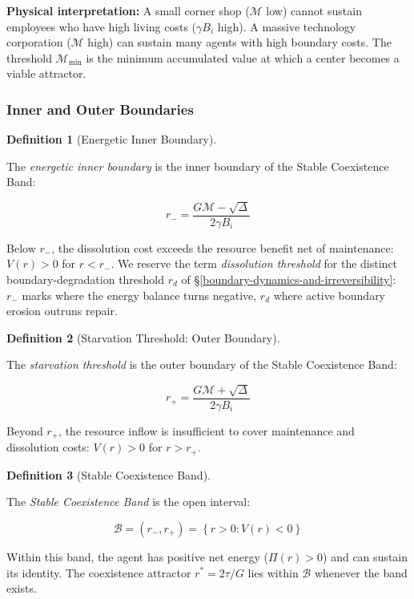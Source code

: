 \documentclass[11pt]{article}
\theoremstyle{plain}
\theoremstyle{definition}
\newtheorem{definition}{Definition}
\theoremstyle{remark}
\let\origsubsubsection\subsubsection
\renewcommand{\subsubsection}{\needspace{4\baselineskip}\origsubsubsection}
\begin{document}
\textbf{Physical interpretation:} A small corner shop (\(\mathcal{M}\)
low) cannot sustain employees who have high living costs (\(\gamma B_i\)
high). A massive technology corporation (\(\mathcal{M}\) high) can
sustain many agents with high boundary costs. The threshold
\(\mathcal{M}_{\min}\) is the minimum accumulated value at which a
center becomes a viable attractor.

\subsubsection{Inner and Outer
Boundaries}\label{inner-and-outer-boundaries}

\begin{definition}[Energetic Inner Boundary]
\label{def-dissolution-threshold}

The \emph{energetic inner boundary} is the inner boundary of the Stable Coexistence Band:

$$r_- = \frac{G\mathcal{M} - \sqrt{\Delta}}{2\gamma B_i}$$

Below $r_-$, the dissolution cost exceeds the resource benefit net of maintenance: $V(r) > 0$ for $r < r_-$. We reserve the term \emph{dissolution threshold} for the distinct boundary-degradation threshold $r_d$ of §\ref{boundary-dynamics-and-irreversibility}: $r_-$ marks where the energy balance turns negative, $r_d$ where active boundary erosion outruns repair.
\end{definition}

\begin{definition}[Starvation Threshold: Outer Boundary]
\label{def-starvation-threshold}

The \emph{starvation threshold} is the outer boundary of the Stable Coexistence Band:

$$r_+ = \frac{G\mathcal{M} + \sqrt{\Delta}}{2\gamma B_i}$$

Beyond $r_+$, the resource inflow is insufficient to cover maintenance and dissolution costs: $V(r) > 0$ for $r > r_+$.
\end{definition}

\begin{definition}[Stable Coexistence Band]
\label{def-stable-coexistence-band}

The \emph{Stable Coexistence Band} is the open interval:

$$\mathcal{B} = (r_-, r_+) = \left\{r > 0 : V(r) < 0\right\}$$

Within this band, the agent has positive net energy ($\Pi(r) > 0$) and can sustain its identity. The coexistence attractor $r^* = 2\tau / G$ lies within $\mathcal{B}$ whenever the band exists.
\end{definition}
\end{document}
